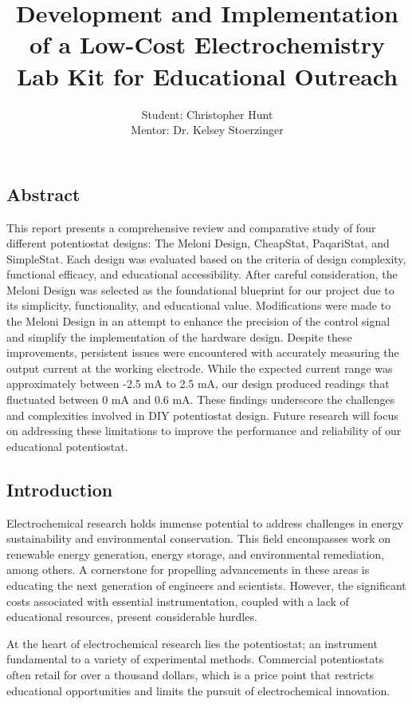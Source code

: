 \documentclass{article}
\title{\textcolor{mycolor}{\textbf{{\huge Development and Implementation of a Low-Cost Electrochemistry Lab Kit for Educational Outreach}}}}
\author{Student: Christopher Hunt \\ Mentor: Dr. Kelsey Stoerzinger}
\date{}
\begin{document}
\pagestyle{fancy}
\fancyhf{}
\rfoot{}
\rhead{\thepage}
\maketitle

\subsection*{Abstract}

This report presents a comprehensive review and comparative study of four different potentiostat designs: The Meloni Design, CheapStat, PaqariStat, and SimpleStat. Each design was evaluated based on the criteria of design complexity, functional efficacy, and educational accessibility. After careful consideration, the Meloni Design was selected as the foundational blueprint for our project due to its simplicity, functionality, and educational value. Modifications were made to the Meloni Design in an attempt to enhance the precision of the control signal and simplify the implementation of the hardware design. Despite these improvements, persistent issues were encountered with accurately measuring the output current at the working electrode. While the expected current range was approximately between -2.5 mA to 2.5 mA, our design produced readings that fluctuated between 0 mA and 0.6 mA. These findings underscore the challenges and complexities involved in DIY potentiostat design. Future research will focus on addressing these limitations to improve the performance and reliability of our educational potentiostat.

\subsection*{Introduction}
Electrochemical research holds immense potential to address challenges in energy sustainability and environmental conservation. This field encompasses work on renewable energy generation, energy storage, and environmental remediation, among others. A cornerstone for propelling advancements in these areas is educating the next generation of engineers and scientists. However, the significant costs associated with essential instrumentation, coupled with a lack of educational resources, present considerable hurdles.

At the heart of electrochemical research lies the potentiostat; an instrument fundamental to a variety of experimental methods. Commercial potentiostats often retail for over a thousand dollars, which is a price point that restricts educational opportunities and limits the pursuit of electrochemical innovation.
\end{document}
